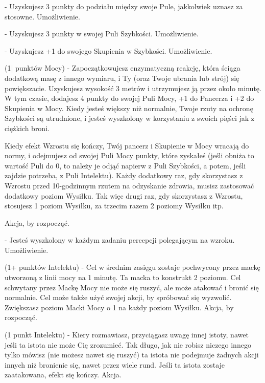 { - Uzyskujesz 3 punkty do podziału między swoje Pule, jakkolwiek uznasz za stosowne. Umożliwienie.

 - Uzyskujesz 3 punkty w swojej Puli Szybkości. Umożliwienie.

 - Uzyskujesz +1 do swojego Skupienia w Szybkości. Umożliwienie.

 (1| punktów Mocy) - Zapoczątkowujesz enzymatyczną reakcję, która ściąga dodatkową masę z innego wymiaru, i Ty (oraz Twoje ubrania lub strój) się powiększacie. Uzyskujesz wysokość 3 metrów i utrzymujesz ją przez około minutę. W tym czasie, dodajesz 4 punkty do swojej Puli Mocy, +1 do Pancerza i +2 do Skupienia w Mocy. Kiedy jesteś większy niż normalnie, Twoje rzuty na ochronę Szybkości są utrudnione, i jesteś wyszkolony w korzystaniu z swoich pięści jak z ciężkich broni. 

Kiedy efekt Wzrostu się kończy, Twój pancerz i Skupienie w Mocy wracają do normy, i odejmujesz od swojej Puli Mocy punkty, które zyskałeś (jeśli obniża to wartość Puli do 0, to należy je odjąć napierw z Puli Szybkości, a potem, jeśli zajdzie potrzeba, z Puli Intelektu). Każdy dodatkowy raz, gdy skorzystasz z Wzrostu przed 10-godzinnym rzutem na odzyskanie zdrowia, musisz zastosować dodatkowy poziom Wysiłku. Tak więc drugi raz, gdy skorzystasz z Wzrostu, stosujesz 1 poziom Wysiłku, za trzecim razem 2 poziomy Wysiłku itp. 

Akcja, by rozpocząć.

 - Jesteś wyszkolony w każdym zadaniu percepcji polegającym na wzroku. Umożliwienie. 

 (1+ punktów Intelektu) - Cel w średnim zasięgu zostaje pochwycony przez mackę utworzoną z linii mocy na 1 minutę. Ta macka to konstrukt 2 poziomu. Cel schwytany przez Mackę Mocy nie może się ruszyć, ale może atakować i bronić się normalnie. Cel może także użyć swojej akcji, by spróbować się wyzwolić. Zwiększasz poziom Macki Mocy o 1 na każdy poziom Wysiłku. Akcja, by rozpocząć. 

 (1 punkt Intelektu) - Kiery rozmawiasz, przyciągasz uwagę innej istoty, nawet jeśli ta istota nie może Cię zrozumieć. Tak długo, jak nie robisz niczego innego tylko mówisz (nie możesz nawet się ruszyć) ta istota nie podejmuje żadnych akcji innych niż bronienie się, nawet przez wiele rund. Jeśli ta istota zostaje zaatakowana, efekt się kończy. Akcja.

}
